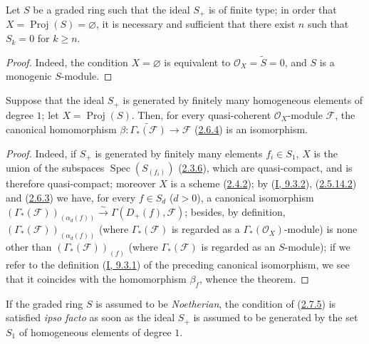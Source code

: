 \begin{corollary}[2.7.4]
\label{II.2.7.4}
Let $S$ be a graded ring such that the ideal $S_+$ is of finite type; in order
that $X=\operatorname{Proj}(S)=\varnothing$, it is necessary and sufficient
that there exist $n$ such that $S_k=0$ for $k\geq n$.
\end{corollary}

\begin{proof}
Indeed, the condition $X=\varnothing$ is equivalent to
$\mathcal{O}_X=\widetilde{S}=0$, and $S$ is a monogenic $S$-module.
\end{proof}

\begin{theorem}[2.7.5]
\label{II.2.7.5}
Suppose that the ideal $S_+$ is generated by finitely many homogeneous
elements of degree $1$; let $X=\operatorname{Proj}(S)$. Then, for every
quasi-coherent $\mathcal{O}_X$-module $\mathcal{F}$, the canonical
homomorphism $\beta:\widetilde{\Gamma_*(\mathcal{F})}
\to\mathcal{F}$ (\hyperref[II.2.6.4]{2.6.4}) is an isomorphism.
\end{theorem}

\begin{proof}
Indeed, if $S_+$ is generated by finitely many elements $f_i\in S_1$, $X$ is
the union of the subspaces $\operatorname{Spec}(S_{(f_i)})$
(\hyperref[II.2.3.6]{2.3.6}), which are quasi-compact, and is therefore
quasi-compact; moreover $X$ is a scheme
(\hyperref[II.2.4.2]{2.4.2}); by
(\hyperref[I.9.3.2]{I, 9.3.2}),
(\hyperref[II.2.5.14.2]{2.5.14.2}) and
(\hyperref[II.2.6.3]{2.6.3}) we have, for every $f\in S_d$ ($d>0$), a
canonical isomorphism
$(\Gamma_*(\mathcal{F}))_{(\alpha_d(f))}\xrightarrow{\sim}
\Gamma(D_+(f),\mathcal{F})$; besides, by definition,
$(\Gamma_*(\mathcal{F}))_{(\alpha_d(f))}$ (where $\Gamma_*(\mathcal{F})$ is
regarded as a $\Gamma_*(\mathcal{O}_X)$-module) is none other than
$(\Gamma_*(\mathcal{F}))_{(f)}$ (where $\Gamma_*(\mathcal{F})$ is regarded
as an $S$-module); if we refer to the definition
(\hyperref[I.9.3.1]{I, 9.3.1}) of the preceding canonical isomorphism, we
see that it coincides with the homomorphism $\beta_f$, whence the theorem.
\end{proof}

\begin{remark}[2.7.6]
\label{II.2.7.6}
If the graded ring $S$ is assumed to be \emph{Noetherian}, the condition of
(\hyperref[II.2.7.5]{2.7.5}) is satisfied \emph{ipso facto} as soon as the
ideal $S_+$ is assumed to be generated by the set $S_1$ of homogeneous elements
of degree $1$.
\end{remark}

